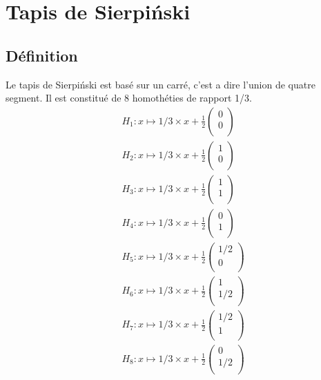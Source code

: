 \documentclass[a4paper, 12pt]{report}
\begin{document}
		\newpage
		\section{Tapis de Sierpiński}
			\subsection{Définition}
			Le tapis de Sierpiński est basé sur un carré, c'est a dire l'union de quatre segment. Il est constitué de 8 homothéties de rapport 1/3.
			\begin{align*}
				&H_1:x\mapsto 1/3\times x+\frac{1}{2}\left(	\begin{array}{ccc}
															0\\
															0\\
														\end{array}\right)\\
				&H_2:x\mapsto 1/3\times x+\frac{1}{2}\left(	\begin{array}{ccc}
																1\\
																0\\
															\end{array}\right)\\
				&H_3:x\mapsto 1/3\times x+\frac{1}{2}\left(	\begin{array}{ccc}
																1\\
																1\\
															\end{array}\right)\\
				&H_4:x\mapsto 1/3\times x+\frac{1}{2}\left(	\begin{array}{ccc}
																0\\
																1\\
															\end{array}\right)\\
				&H_5:x\mapsto 1/3\times x+\frac{1}{2}\left(	\begin{array}{ccc}
																1/2\\
																0\\
															\end{array}\right)\\
				&H_6:x\mapsto 1/3\times x+\frac{1}{2}\left(	\begin{array}{ccc}
																1\\
																1/2\\
															\end{array}\right)\\
				&H_7:x\mapsto 1/3\times x+\frac{1}{2}\left(	\begin{array}{ccc}
																1/2\\
																1\\
															\end{array}\right)\\
				&H_8:x\mapsto 1/3\times x+\frac{1}{2}\left(	\begin{array}{ccc}
																0\\
																1/2\\
															\end{array}\right)
			\end{align*}
\end{document}
